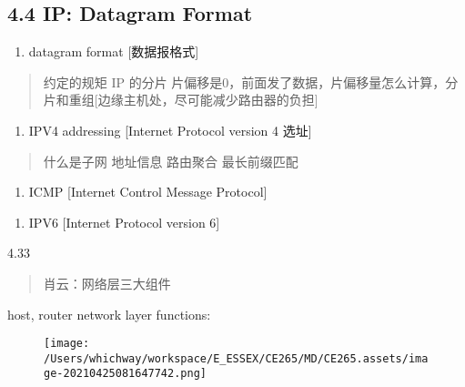 \documentclass[
]{article}
\begin{document}
\hypertarget{44-ip-datagram-format}{%
\subsection{4.4 IP: Datagram Format}\label{44-ip-datagram-format}}

\begin{quote}
\end{quote}

\begin{enumerate}
\def\labelenumi{\arabic{enumi}.}
\item
  datagram format {[}数据报格式{]}
\end{enumerate}

\begin{quote}
约定的规矩 IP 的分片
片偏移是0，前面发了数据，片偏移量怎么计算，分片和重组{[}边缘主机处，尽可能减少路由器的负担{]}
\end{quote}

\begin{enumerate}
\def\labelenumi{\arabic{enumi}.}
\item
  IPV4 addressing {[}Internet Protocol version 4 选址{]}
\end{enumerate}

\begin{quote}
什么是子网 地址信息 路由聚合 最长前缀匹配
\end{quote}

\begin{enumerate}
\def\labelenumi{\arabic{enumi}.}
\item
  ICMP {[}Internet Control Message Protocol{]}
\end{enumerate}

\begin{quote}
\end{quote}

\begin{enumerate}
\def\labelenumi{\arabic{enumi}.}
\item
  IPV6 {[}Internet Protocol version 6{]}
\end{enumerate}

4.33

\begin{quote}
肖云：网络层三大组件
\end{quote}

host, router network layer functions:

\begin{figure}
\centering
\texttt{[image: /Users/whichway/workspace/E\_ESSEX/CE265/MD/CE265.assets/image-20210425081647742.png]}
\caption{}
\end{figure}
\end{document}
